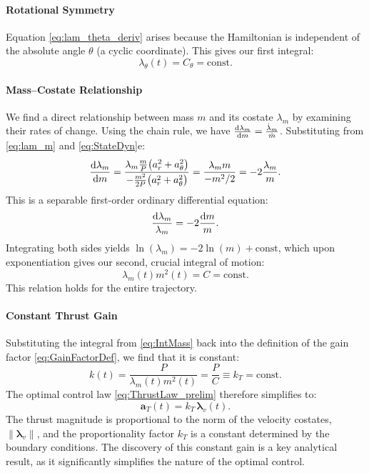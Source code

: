 \documentclass[journal, a4paper]{IEEEtran}
\begin{document}
\paragraph{Rotational Symmetry}
Equation \eqref{eq:lam_theta_deriv} arises because the Hamiltonian is independent of the absolute angle $\theta$ (a cyclic coordinate). This gives our first integral:
\begin{equation}
  \boxed{\lambda_\theta(t) = C_\theta = \text{const}}.
\end{equation}

\paragraph{Mass–Costate Relationship}
We find a direct relationship between mass $m$ and its costate $\lambda_m$ by examining their rates of change. Using the chain rule, we have $\frac{{\rm d}\lambda_m}{{\rm d}m} = \frac{\dot\lambda_m}{\dot m}$. Substituting from \eqref{eq:lam_m} and \eqref{eq:StateDyn}e:
\begin{equation}
    \frac{{\rm d}\lambda_m}{{\rm d}m} = \frac{\lambda_m \frac{m}{P}\bigl(a_r^{2}+a_\theta^{2}\bigr)}{-\frac{m^{2}}{2P}\bigl(a_r^{2}+a_\theta^{2}\bigr)} = \frac{\lambda_m m}{-m^2/2} = -2\frac{\lambda_m}{m}. \nonumber
\end{equation}
This is a separable first-order ordinary differential equation:
\[
    \frac{{\rm d}\lambda_m}{\lambda_m} = -2\frac{{\rm d}m}{m}.
\]
Integrating both sides yields $\ln(\lambda_m) = -2\ln(m) + \text{const}$, which upon exponentiation gives our second, crucial integral of motion:
\begin{equation}
  \boxed{\lambda_m(t) m^2(t) = C = \text{const}}.
  \label{eq:IntMass}
\end{equation}
This relation holds for the entire trajectory.

\paragraph{Constant Thrust Gain}
Substituting the integral from \eqref{eq:IntMass} back into the definition of the gain factor \eqref{eq:GainFactorDef}, we find that it is constant:
\begin{equation}
  k(t) = \frac{P}{\lambda_m(t) m^2(t)} = \frac{P}{C} \equiv k_T = \text{const}.
\end{equation}
The optimal control law \eqref{eq:ThrustLaw_prelim} therefore simplifies to:
\begin{equation}
  \mathbf{a}_T(t) = k_T\,\boldsymbol{\lambda}_v(t).
  \label{eq:ThrustLaw_Final}
\end{equation}
The thrust magnitude is proportional to the norm of the velocity costates, $\|\boldsymbol{\lambda}_v\|$, and the proportionality factor $k_T$ is a constant determined by the boundary conditions. The discovery of this constant gain is a key analytical result, as it significantly simplifies the nature of the optimal control.
\end{document}
